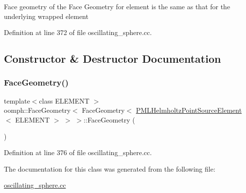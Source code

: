 Face geometry of the Face Geometry for element is the same as that for the underlying wrapped element 

Definition at line 372 of file oscillating\+\_\+sphere.\+cc.



\subsection{Constructor \& Destructor Documentation}
\mbox{\label{classoomph_1_1FaceGeometry_3_01FaceGeometry_3_01PMLHelmholtzPointSourceElement_3_01ELEMENT_01_4_01_4_01_4_a5f758bdf1350e4b9a2cea1bcfa26df76}} 
\subsubsection{\texorpdfstring{Face\+Geometry()}{FaceGeometry()}}
{\footnotesize\ttfamily template$<$class E\+L\+E\+M\+E\+NT $>$ \\
oomph\+::\+Face\+Geometry$<$ Face\+Geometry$<$ \hyperlink{classoomph_1_1PMLHelmholtzPointSourceElement}{P\+M\+L\+Helmholtz\+Point\+Source\+Element}$<$ E\+L\+E\+M\+E\+NT $>$ $>$ $>$\+::Face\+Geometry (\begin{DoxyParamCaption}{ }\end{DoxyParamCaption})\hspace{0.3cm}{\ttfamily [inline]}}



Definition at line 376 of file oscillating\+\_\+sphere.\+cc.



The documentation for this class was generated from the following file\+:\begin{DoxyCompactItemize}
\item 
\hyperlink{oscillating__sphere_8cc}{oscillating\+\_\+sphere.\+cc}\end{DoxyCompactItemize}
